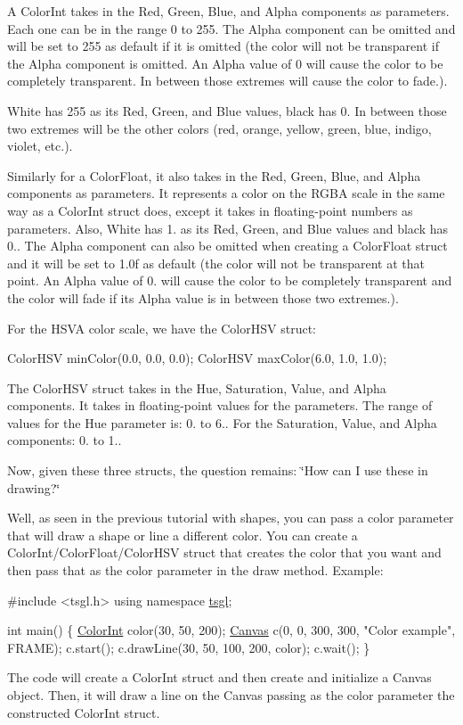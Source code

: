 A Color\+Int takes in the Red, Green, Blue, and Alpha components as parameters. Each one can be in the range 0 to 255. The Alpha component can be omitted and will be set to 255 as default if it is omitted (the color will not be transparent if the Alpha component is omitted. An Alpha value of 0 will cause the color to be completely transparent. In between those extremes will cause the color to fade.).

White has 255 as its Red, Green, and Blue values, black has 0. In between those two extremes will be the other colors (red, orange, yellow, green, blue, indigo, violet, etc.).

Similarly for a Color\+Float, it also takes in the Red, Green, Blue, and Alpha components as parameters. It represents a color on the R\+G\+B\+A scale in the same way as a Color\+Int struct does, except it takes in floating-\/point numbers as parameters. Also, White has 1. as its Red, Green, and Blue values and black has 0.. The Alpha component can also be omitted when creating a Color\+Float struct and it will be set to 1.\+0f as default (the color will not be transparent at that point. An Alpha value of 0. will cause the color to be completely transparent and the color will fade if its Alpha value is in between those two extremes.).

For the H\+S\+V\+A color scale, we have the Color\+H\+S\+V struct\+:


\begin{DoxyCode}
ColorHSV minColor(0.0, 0.0, 0.0);
ColorHSV maxColor(6.0, 1.0, 1.0);
\end{DoxyCode}


The Color\+H\+S\+V struct takes in the Hue, Saturation, Value, and Alpha components. It takes in floating-\/point values for the parameters. The range of values for the Hue parameter is\+: 0. to 6.. For the Saturation, Value, and Alpha components\+: 0. to 1..

Now, given these three structs, the question remains\+: \char`\"{}\+How can I use these in drawing?\char`\"{}

Well, as seen in the previous tutorial with shapes, you can pass a color parameter that will draw a shape or line a different color. You can create a Color\+Int/\+Color\+Float/\+Color\+H\+S\+V struct that creates the color that you want and then pass that as the color parameter in the draw method. Example\+:


\begin{DoxyCode}
\textcolor{preprocessor}{#include <tsgl.h>}
\textcolor{keyword}{using namespace }\hyperlink{namespacetsgl}{tsgl};

\textcolor{keywordtype}{int} main() \{
  \hyperlink{structtsgl_1_1_color_int}{ColorInt} color(30, 50, 200);
  \hyperlink{classtsgl_1_1_canvas}{Canvas} c(0, 0, 300, 300, \textcolor{stringliteral}{"Color example"}, FRAME);
  c.start();
  c.drawLine(30, 50, 100, 200, color);
  c.wait();
\}
\end{DoxyCode}
 The code will create a Color\+Int struct and then create and initialize a Canvas object. Then, it will draw a line on the Canvas passing as the color parameter the constructed Color\+Int struct.

